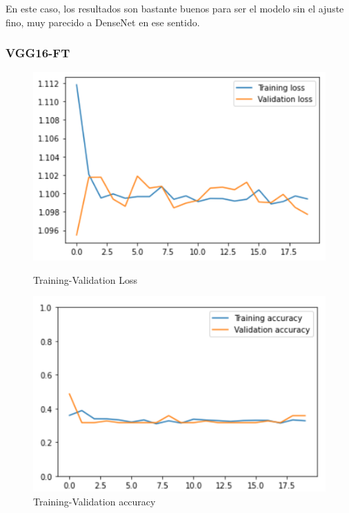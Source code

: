 \documentclass[11pt,a4paper]{article}
\theoremstyle{definition}
\begin{document}
En este caso, los resultados son bastante buenos para ser el modelo sin el ajuste fino, muy parecido a DenseNet en ese sentido.

\subsubsection{VGG16-FT}

\begin{figure}[H]
  \centering
  \begin{minipage}[b]{0.45\textwidth}
    \includegraphics[scale=0.75]{./images/vgg2loss}
	\caption{Training-Validation Loss}
  \end{minipage}
  \hfill
  \begin{minipage}[b]{0.45\textwidth}
    \includegraphics[scale=0.75]{./images/vgg2acc}
	\caption{Training-Validation accuracy}
  \end{minipage}
\end{figure}
\end{document}

